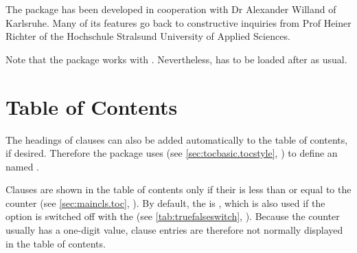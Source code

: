 The package has been developed in cooperation with Dr Alexander Willand of
Karlsruhe. Many of its features go back to constructive inquiries from Prof
Heiner Richter of the Hochschule Stralsund University of Applied Sciences.

Note that the package works with
. Nevertheless, 
has to be loaded after  as usual.



\section{Table of Contents}

The headings of clauses can also be added automatically to the table of
contents, if desired.
Therefore the package uses
(see \autoref{sec:tocbasic.tocstyle},
) to define an  named .


\begin{Declaration}
\end{Declaration}
Clauses are shown in the table of contents only if their
 is less than or equal to the
%
 counter
(see \autoref{sec:maincls.toc}, ). By
default, the  is , which is also used if
the option is switched off with the  (see
\autoref{tab:truefalseswitch}, ). Because the
 counter usually has a one-digit value,
clause entries are therefore not normally displayed in the table of contents.

